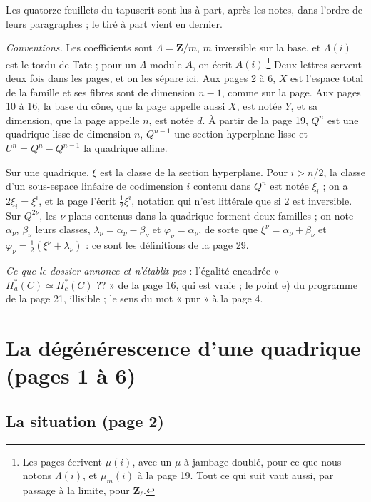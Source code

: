 \documentclass[11pt,a4paper]{article}
\begin{document}
Les quatorze feuillets du tapuscrit sont lus à part, après les notes, dans
l'ordre de leurs paragraphes ; le tiré à part vient en dernier.

\emph{Conventions.} Les coefficients sont $\Lambda = \mathbf{Z}/m$, $m$
inversible sur la base, et $\Lambda(i)$ est le tordu de Tate ; pour un
$\Lambda$-module $A$, on écrit $A(i)$.\footnote{Les pages écrivent
$\mu(i)$, avec un $\mu$ à jambage doublé, pour ce que nous notons
$\Lambda(i)$, et $\mu_{m}(i)$ à la page 19. Tout ce qui suit vaut aussi, par
passage à la limite, pour $\mathbf{Z}_{\ell}$.} Deux lettres servent deux
fois dans les pages, et on les sépare ici. Aux pages 2 à 6, $X$ est
l'espace total de la famille et ses fibres sont de dimension $n - 1$,
comme sur la page. Aux pages 10 à 16, la base du cône, que la page appelle
aussi $X$, est notée $Y$, et sa dimension, que la page appelle $n$, est
notée $d$. À partir de la page 19, $Q^{n}$ est une quadrique lisse de
dimension $n$, $Q^{n-1}$ une section hyperplane lisse et
$U^{n} = Q^{n} - Q^{n-1}$ la quadrique affine.

Sur une quadrique, $\xi$ est la classe de la section hyperplane. Pour
$i > n/2$, la classe d'un sous-espace linéaire de codimension $i$ contenu
dans $Q^{n}$ est notée $\xi_{i}$ ; on a $2\xi_{i} = \xi^{i}$, et la page
l'écrit $\tfrac12 \xi^{i}$, notation qui n'est littérale que si $2$ est
inversible. Sur $Q^{2\nu}$, les $\nu$-plans contenus dans la quadrique
forment deux familles ; on note $\alpha_{\nu}$, $\beta_{\nu}$ leurs classes,
$\lambda_{\nu} = \alpha_{\nu} - \beta_{\nu}$ et
$\varphi_{\nu} = \alpha_{\nu}$, de sorte que
$\xi^{\nu} = \alpha_{\nu} + \beta_{\nu}$ et
$\varphi_{\nu} = \tfrac12(\xi^{\nu} + \lambda_{\nu})$ : ce sont les
définitions de la page 29.

\emph{Ce que le dossier annonce et n'établit pas} : l'égalité encadrée
« $H^{*}_{a}(C) \simeq H^{*}_{c}(C)$ ?? » de la page 16, qui est vraie ;
le point e) du programme de la page 21, illisible ; le sens du mot
« pur » à la page 4.

\section*{La dégénérescence d'une quadrique (pages 1 à 6)}

\subsection*{La situation (page 2)}
\end{document}
